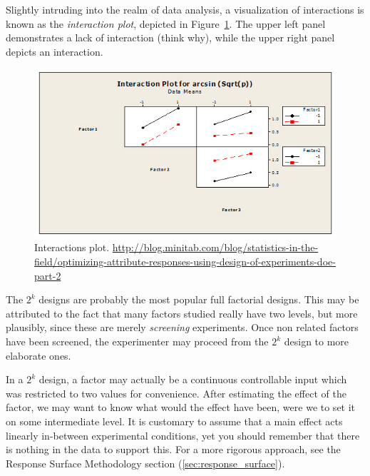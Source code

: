 
Slightly intruding into the realm of data analysis, a visualization of interactions is known as the \emph{interaction plot}, depicted in Figure~\ref{fig:interaction_plot}. 
The upper left panel demonstrates a lack of interaction (think why), while the upper right panel depicts an interaction.
\begin{figure}[ht]
\centering
\includegraphics[width=0.3\textheight]{art/attribute_doe_interaction_plot}
\caption{Interactions plot. \newline \url{http://blog.minitab.com/blog/statistics-in-the-field/optimizing-attribute-responses-using-design-of-experiments-doe-part-2}}
\label{fig:interaction_plot}
\end{figure}


\begin{remark}
The $2^k$ designs are probably the most popular full factorial designs. 
This may be attributed to the fact that many factors studied really have two levels, but more plausibly, since these are merely \emph{screening} experiments. 
Once non related factors have been screened, the experimenter may proceed from the $2^k$ design to more elaborate ones. 
\end{remark}



\begin{remark}
In a $2^k$ design, a factor may actually be a continuous controllable input which was restricted to two values for convenience. 
After estimating the effect of the factor, we may want to know what would the effect have been, were we to set it on some intermediate level.
It is customary to assume that a main effect acts linearly in-between experimental conditions, yet you should remember that there is nothing in the data to support this.
For a more rigorous approach, see the Response Surface Methodology section (\ref{sec:response_surface}).
\end{remark}


